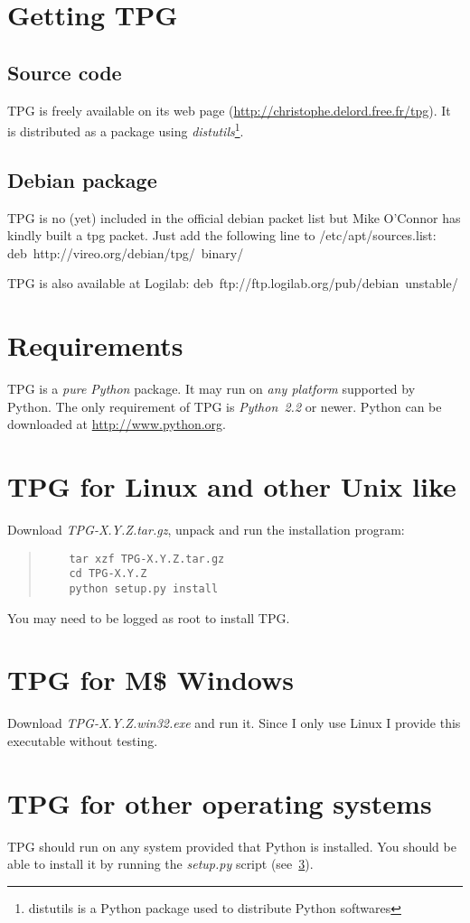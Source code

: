 
\section{Getting TPG}

\subsection{Source code}

TPG is freely available on its web page (\url{http://christophe.delord.free.fr/tpg}). It is distributed as a package using \emph{distutils}\footnote{distutils is a Python package used to distribute Python softwares}.

\subsection{Debian package}

TPG is no (yet) included in the official debian packet list but Mike O'Connor has kindly built a tpg packet. Just add the following line to /etc/apt/sources.list:
deb~http://vireo.org/debian/tpg/~binary/

TPG is also available at Logilab:
deb~ftp://ftp.logilab.org/pub/debian~unstable/

\section{Requirements}

TPG is a \emph{pure Python} package.
It may run on \emph{any platform} supported by Python.
The only requirement of TPG is \emph{Python~2.2} or newer. Python can be downloaded at \url{http://www.python.org}.

\section{TPG for Linux and other Unix like}                 \label{linux_install}

Download \mbox{\emph{TPG-X.Y.Z.tar.gz}}, unpack and run the installation program:
\begin{quote}
\begin{verbatim}
    tar xzf TPG-X.Y.Z.tar.gz
    cd TPG-X.Y.Z
    python setup.py install
\end{verbatim}
\end{quote}
You may need to be logged as root to install TPG.

\section{TPG for M\$ Windows}

Download \mbox{\emph{TPG-X.Y.Z.win32.exe}} and run it.
Since I only use Linux I provide this executable without testing.

\section{TPG for other operating systems}

TPG should run on any system provided that Python is installed. You should be able to install it by running the \mbox{\emph{setup.py}} script (see~\ref{linux_install}).
